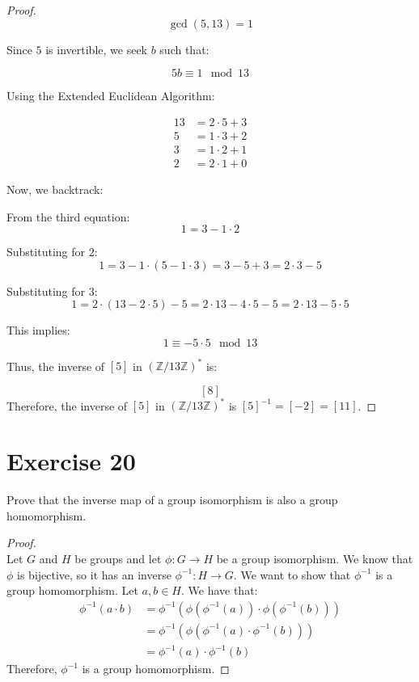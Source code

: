 \documentclass{article}
\begin{document}
\begin{enumerate}
\begin{proof}
\[
    \gcd(5, 13) = 1
    \]
    
    Since \(5\) is invertible, we seek \(b\) such that:
    
    \[
    5b \equiv 1 \mod 13
    \]
    
    Using the Extended Euclidean Algorithm:
    
    \begin{align*}
    13 &= 2 \cdot 5 + 3 \\
    5 &= 1 \cdot 3 + 2 \\
    3 &= 1 \cdot 2 + 1 \\
    2 &= 2 \cdot 1 + 0
    \end{align*}
    
    Now, we backtrack:
    
    From the third equation:
    \[
    1 = 3 - 1 \cdot 2
    \]
    
    Substituting for \(2\):
    \[
    1 = 3 - 1 \cdot (5 - 1 \cdot 3) = 3 - 5 + 3 = 2 \cdot 3 - 5
    \]
    
    Substituting for \(3\):
    \[
    1 = 2 \cdot (13 - 2 \cdot 5) - 5 = 2 \cdot 13 - 4 \cdot 5 - 5 = 2 \cdot 13 - 5 \cdot 5
    \]
    
    This implies:
    \[
    1 \equiv -5 \cdot 5 \mod 13
    \]
    
    Thus, the inverse of \([5]\) in \((\mathbb{Z}/13\mathbb{Z})^*\) is:
    
    \[
    \boxed{[8]}
    \]
        Therefore, the inverse of $[5]$ in $(\mathbb{Z}/13\mathbb{Z})^*$ is $[5]^{-1} = [-2] = [11]$.

    \end{proof}
\end{enumerate}

\section*{Exercise 20}
Prove that the inverse map of a group isomorphism is also a group homomorphism.
\begin{proof}
    \leavevmode \\ 
    Let $G$ and $H$ be groups and let $\phi: G \to H$ be a group isomorphism. We know that $\phi$ is bijective, so it has an inverse $\phi^{-1}: H \to G$. We want to show that $\phi^{-1}$ is a group homomorphism. Let $a, b \in H$. We have that:
    \begin{align*}
        \phi^{-1}(a \cdot b) &= \phi^{-1}(\phi(\phi^{-1}(a)) \cdot \phi(\phi^{-1}(b))) \\
        &= \phi^{-1}(\phi(\phi^{-1}(a) \cdot \phi^{-1}(b))) \\
        &= \phi^{-1}(a) \cdot \phi^{-1}(b)
    \end{align*}
    Therefore, $\phi^{-1}$ is a group homomorphism.
\end{proof}
\end{document}
